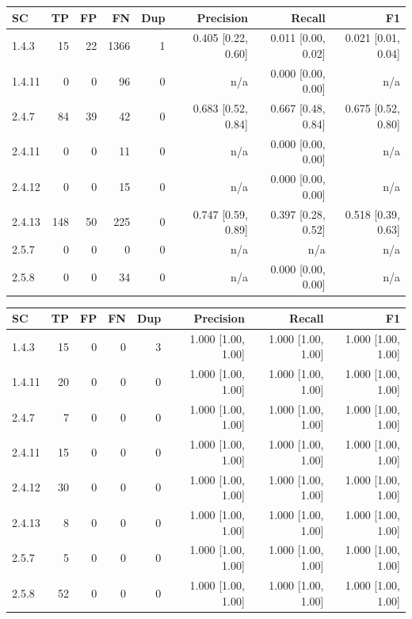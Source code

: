 \begin{tabular}{lrrrrrrr}
\hline
SC & TP & FP & FN & Dup & Precision & Recall & F1 \\
\hline
1.4.3 & 15 & 22 & 1366 & 1 & 0.405 [0.22, 0.60] & 0.011 [0.00, 0.02] & 0.021 [0.01, 0.04] \\
1.4.11 & 0 & 0 & 96 & 0 & n/a & 0.000 [0.00, 0.00] & n/a \\
2.4.7 & 84 & 39 & 42 & 0 & 0.683 [0.52, 0.84] & 0.667 [0.48, 0.84] & 0.675 [0.52, 0.80] \\
2.4.11 & 0 & 0 & 11 & 0 & n/a & 0.000 [0.00, 0.00] & n/a \\
2.4.12 & 0 & 0 & 15 & 0 & n/a & 0.000 [0.00, 0.00] & n/a \\
2.4.13 & 148 & 50 & 225 & 0 & 0.747 [0.59, 0.89] & 0.397 [0.28, 0.52] & 0.518 [0.39, 0.63] \\
2.5.7 & 0 & 0 & 0 & 0 & n/a & n/a & n/a \\
2.5.8 & 0 & 0 & 34 & 0 & n/a & 0.000 [0.00, 0.00] & n/a \\
\hline
\end{tabular}

\begin{tabular}{lrrrrrrr}
\hline
SC & TP & FP & FN & Dup & Precision & Recall & F1 \\
\hline
1.4.3 & 15 & 0 & 0 & 3 & 1.000 [1.00, 1.00] & 1.000 [1.00, 1.00] & 1.000 [1.00, 1.00] \\
1.4.11 & 20 & 0 & 0 & 0 & 1.000 [1.00, 1.00] & 1.000 [1.00, 1.00] & 1.000 [1.00, 1.00] \\
2.4.7 & 7 & 0 & 0 & 0 & 1.000 [1.00, 1.00] & 1.000 [1.00, 1.00] & 1.000 [1.00, 1.00] \\
2.4.11 & 15 & 0 & 0 & 0 & 1.000 [1.00, 1.00] & 1.000 [1.00, 1.00] & 1.000 [1.00, 1.00] \\
2.4.12 & 30 & 0 & 0 & 0 & 1.000 [1.00, 1.00] & 1.000 [1.00, 1.00] & 1.000 [1.00, 1.00] \\
2.4.13 & 8 & 0 & 0 & 0 & 1.000 [1.00, 1.00] & 1.000 [1.00, 1.00] & 1.000 [1.00, 1.00] \\
2.5.7 & 5 & 0 & 0 & 0 & 1.000 [1.00, 1.00] & 1.000 [1.00, 1.00] & 1.000 [1.00, 1.00] \\
2.5.8 & 52 & 0 & 0 & 0 & 1.000 [1.00, 1.00] & 1.000 [1.00, 1.00] & 1.000 [1.00, 1.00] \\
\hline
\end{tabular}

